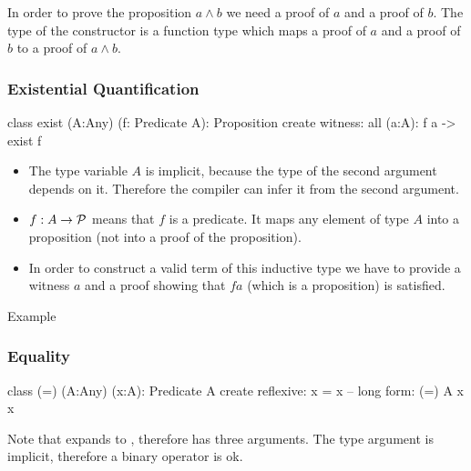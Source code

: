 In order to prove the proposition $a \land b$ we need a proof of $a$ and a
proof of $b$. The type of the constructor is a function type which maps a
proof of $a$ and a proof of $b$ to a proof of $a \land b$.
\newline





\subsubsection{Existential Quantification}

\begin{alba}
  class
    exist (A:Any) (f: Predicate A): Proposition
  create
    witness: all (a:A): f a -> exist f
\end{alba}

\begin{itemize}
\item The type variable $A$ is implicit, because the type of the second
  argument depends on it. Therefore the compiler can infer it from the second
  argument.

\item $f:A\to {\cal{P}}$ means that $f$ is a predicate. It maps any element of
  type $A$ into a proposition (not into a proof of the proposition).

\item In order to construct a valid term of this inductive type we have to
  provide a witness $a$ and a proof showing that $f a$ (which is a
  proposition) is satisfied.
\end{itemize}

Example
\vskip 2mm


\subsubsection{Equality}
\label{sec:equality}

\begin{alba}
  class
    (=) (A:Any) (x:A): Predicate A
  create
    reflexive: x = x    -- long form: (=) A x x
\end{alba}

Note that  expands to , therefore
\code{(=)} has three arguments. The type argument is implicit, therefore a
binary operator is ok.
\vskip 2mm








